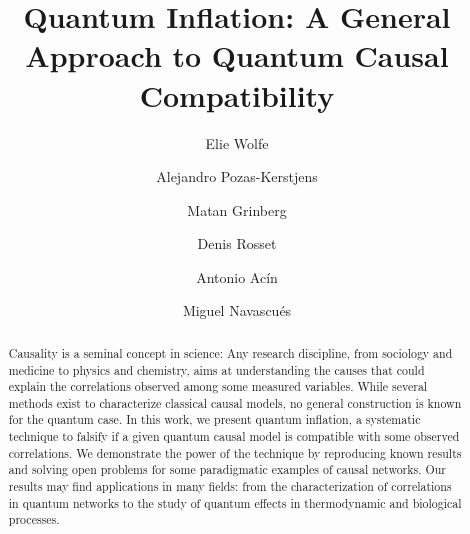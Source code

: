 \documentclass[superscriptaddress,aps,prx,nofootinbib,twocolumn,twoside,reprint,letterpaper,longbibliography]{revtex4-2}
\begin{document}
\title{Quantum Inflation: A General Approach to Quantum Causal Compatibility}

\author{Elie Wolfe}

\author{Alejandro Pozas-Kerstjens}

\author{Matan Grinberg}

\author{Denis Rosset}

\author{Antonio Ac\'in}

\author{Miguel Navascu\'es}

\begin{abstract}
Causality is a seminal concept in science: Any research discipline, from sociology and medicine to physics and chemistry, aims at understanding the causes that could explain the correlations observed among some measured variables.
While several methods exist to characterize classical causal models, no general construction is known for the quantum case.
In this work, we present quantum inflation, a systematic technique to falsify if a given quantum causal model is compatible with some observed correlations.
We demonstrate the power of the technique by reproducing known results and solving open problems for some paradigmatic examples of causal networks.
Our results may find applications in many fields: from the characterization of correlations in quantum networks to the study of quantum effects in thermodynamic and biological processes.
\end{abstract}

\maketitle
\end{document}
